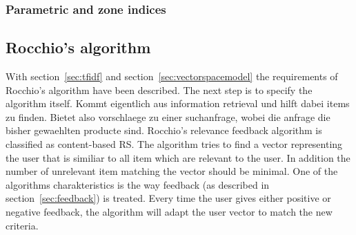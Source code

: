 \subsubsection{Parametric and zone indices}
\label{sec:parametricandzoneindices}



\subsection{Rocchio's algorithm}
\label{sec:rocchio}
\iffalse
Beschreibung des Rocchio algorithmus
\fi
With section~\ref{sec:tfidf} and section~\ref{sec:vectorspacemodel} the requirements of Rocchio's algorithm have been described.\citep[p.~178]{manning:2009}
The next step is to specify the algorithm itself.
{\color{red} Kommt eigentlich aus information retrieval und hilft dabei items zu finden.
Bietet also vorschlaege zu einer suchanfrage, wobei die anfrage die bisher gewaehlten producte sind.}
Rocchio's relevance feedback algorithm is classified as content-based RS.\citep[p.~92]{lops:2011}
The algorithm tries to find a vector representing the user that is similiar to all item which are relevant to the user.
In addition the number of unrelevant item matching the vector should be minimal.\citep[p.~178-181]{manning:2009}
One of the algorithms charakteristics is the way feedback (as described in section~\ref{sec:feedback}) is treated.
Every time the user gives either positive or negative feedback, the algorithm will adapt the user vector to match the new criteria.\citep[p.~387-388]{pazzani:2007}
\\

